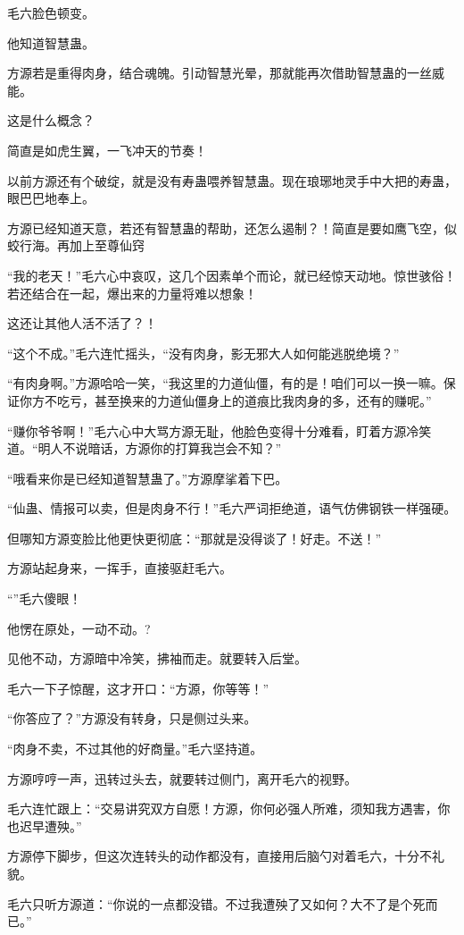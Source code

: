 \begin{this_body}
毛六脸色顿变。

他知道智慧蛊。

方源若是重得肉身，结合魂魄。引动智慧光晕，那就能再次借助智慧蛊的一丝威能。

这是什么概念？

简直是如虎生翼，一飞冲天的节奏！

以前方源还有个破绽，就是没有寿蛊喂养智慧蛊。现在琅琊地灵手中大把的寿蛊，眼巴巴地奉上。

方源已经知道天意，若还有智慧蛊的帮助，还怎么遏制？！简直是要如鹰飞空，似蛟行海。再加上至尊仙窍

“我的老天！”毛六心中哀叹，这几个因素单个而论，就已经惊天动地。惊世骇俗！若还结合在一起，爆出来的力量将难以想象！

这还让其他人活不活了？！

“这个不成。”毛六连忙摇头，“没有肉身，影无邪大人如何能逃脱绝境？”

“有肉身啊。”方源哈哈一笑，“我这里的力道仙僵，有的是！咱们可以一换一嘛。保证你方不吃亏，甚至换来的力道仙僵身上的道痕比我肉身的多，还有的赚呢。”

“赚你爷爷啊！”毛六心中大骂方源无耻，他脸色变得十分难看，盯着方源冷笑道。“明人不说暗话，方源你的打算我岂会不知？”

“哦看来你是已经知道智慧蛊了。”方源摩挲着下巴。

“仙蛊、情报可以卖，但是肉身不行！”毛六严词拒绝道，语气仿佛钢铁一样强硬。

但哪知方源变脸比他更快更彻底：“那就是没得谈了！好走。不送！”

方源站起身来，一挥手，直接驱赶毛六。

“”毛六傻眼！

他愣在原处，一动不动。?

见他不动，方源暗中冷笑，拂袖而走。就要转入后堂。

毛六一下子惊醒，这才开口：“方源，你等等！”

“你答应了？”方源没有转身，只是侧过头来。

“肉身不卖，不过其他的好商量。”毛六坚持道。

方源哼哼一声，迅转过头去，就要转过侧门，离开毛六的视野。

毛六连忙跟上：“交易讲究双方自愿！方源，你何必强人所难，须知我方遇害，你也迟早遭殃。”

方源停下脚步，但这次连转头的动作都没有，直接用后脑勺对着毛六，十分不礼貌。

毛六只听方源道：“你说的一点都没错。不过我遭殃了又如何？大不了是个死而已。”


\end{this_body}
